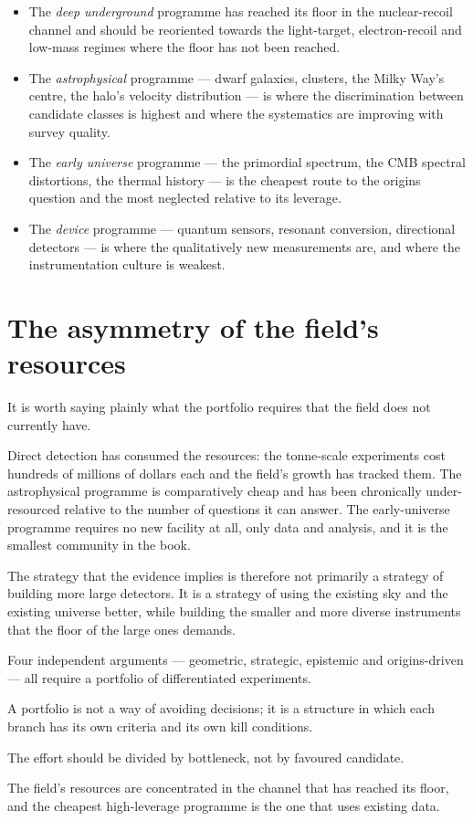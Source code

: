 \begin{itemize}
\item The \emph{deep underground} programme has reached its floor in the
nuclear-recoil channel and should be reoriented towards the light-target,
electron-recoil and low-mass regimes where the floor has not been reached.
\item The \emph{astrophysical} programme --- dwarf galaxies, clusters, the
Milky Way's centre, the halo's velocity distribution --- is where the
discrimination between candidate classes is highest and where the
systematics are improving with survey quality.
\item The \emph{early universe} programme --- the primordial spectrum, the
CMB spectral distortions, the thermal history --- is the cheapest route to
the origins question and the most neglected relative to its leverage.
\item The \emph{device} programme --- quantum sensors, resonant conversion,
directional detectors --- is where the qualitatively new measurements are,
and where the instrumentation culture is weakest.
\end{itemize}

\section{The asymmetry of the field's resources}It is worth saying plainly
what the portfolio requires that the field does not currently have.

Direct detection has consumed the resources: the tonne-scale experiments
cost hundreds of millions of dollars each and the field's growth has tracked
them. The astrophysical programme is comparatively cheap and has been
chronically under-resourced relative to the number of questions it can
answer. The early-universe programme requires no new facility at all, only
data and analysis, and it is the smallest community in the book.

The strategy that the evidence implies is therefore not primarily a
strategy of building more large detectors. It is a strategy of using the
existing sky and the existing universe better, while building the smaller
and more diverse instruments that the floor of the large ones demands.

\begin{keytakeaways}
\item Four independent arguments --- geometric, strategic, epistemic and
origins-driven --- all require a portfolio of differentiated experiments.
\item A portfolio is not a way of avoiding decisions; it is a structure in
which each branch has its own criteria and its own kill conditions.
\item The effort should be divided by bottleneck, not by favoured candidate.
\item The field's resources are concentrated in the channel that has reached
its floor, and the cheapest high-leverage programme is the one that uses
existing data.
\end{keytakeaways}
